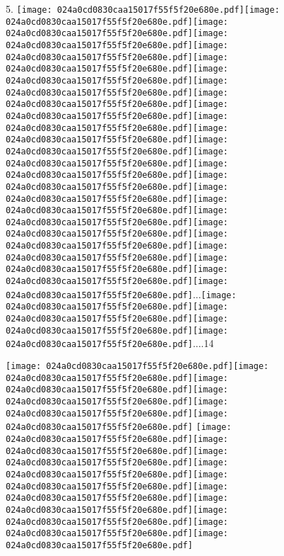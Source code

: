 \documentclass{article}
\newcommand{\origpg}[2]{\texttt{[image: 024a0cd0830caa15017f55f5f20e680e.pdf]}}
\begin{document}
{\vspace{0.626pt}\hspace{18.094pt}5. \origpg2{121.46pt 428.44pt 129.55pt 444.58pt}\origpg2{129.63pt 428.44pt 136.8pt 444.58pt}\hspace{-0.178pt}\origpg2{136.62pt 428.44pt 144.46pt 444.58pt}\origpg2{144.56pt 428.44pt 152.61pt 444.58pt}\origpg2{152.52pt 428.44pt 164.57pt 444.58pt}\hspace{-0.742pt}\origpg2{163.83pt 428.44pt 171.95pt 444.58pt}\origpg2{172pt 428.44pt 179.17pt 444.58pt}\hspace{-0.178pt}\origpg2{178.99pt 428.44pt 187.62pt 444.58pt}\origpg2{187.62pt 428.44pt 196.26pt 444.58pt}\origpg2{69mm 428.44pt 203.49pt 444.58pt}\origpg2{203.39pt 428.44pt 219.53pt 444.58pt}\origpg2{219.53pt 428.44pt 235.67pt 444.58pt}\origpg2{235.67pt 428.44pt 251.81pt 444.58pt}\origpg2{251.81pt 428.44pt 267.95pt 444.58pt}\hspace{-0.242pt}\origpg2{267.71pt 428.44pt 283.85pt 444.58pt}\origpg2{283.85pt 428.44pt 299.99pt 444.58pt}\origpg2{299.99pt 428.44pt 316.13pt 444.58pt}\hspace{-0.242pt}\origpg2{315.89pt 428.44pt 332.03pt 444.58pt}\origpg2{332.03pt 428.44pt 348.17pt 444.58pt}\hspace{-0.242pt}\origpg2{347.93pt 428.44pt 364.07pt 444.58pt}\hspace{-0.242pt}\origpg2{363.82pt 428.44pt 379.96pt 444.58pt}\origpg2{379.96pt 428.44pt 396.11pt 444.58pt}\origpg2{396.11pt 428.44pt 412.25pt 444.58pt}\origpg2{412.25pt 428.44pt 428.39pt 444.58pt}\hspace{-0.242pt}\origpg2{428.14pt 428.44pt 444.28pt 444.58pt}...\origpg2{456.31pt 428.44pt 472.45pt 444.58pt}\origpg2{472.45pt 428.44pt 488.59pt 444.58pt}\hspace{-0.242pt}\origpg2{488.35pt 428.44pt 504.49pt 444.58pt}\origpg2{504.49pt 428.44pt 520.63pt 444.58pt}....14 

\vspace{19.995pt}\hspace{36.161pt} 

\vspace{27.964pt}\origpg2{85.303pt 380.48pt 96.068pt 396.62pt}\origpg2{96.133pt 380.48pt 104.77pt 396.62pt}\origpg2{104.77pt 380.48pt 113.4pt 396.62pt}\hspace{-0.161pt}\origpg2{113.24pt 380.48pt 120.41pt 396.62pt}\origpg2{120.46pt 380.48pt 128.53pt 396.62pt}\hspace{-0.113pt}\origpg2{128.41pt 380.48pt 136.26pt 396.62pt} \origpg2{140.44pt 380.48pt 148.49pt 396.62pt}\origpg2{148.4pt 380.48pt 157.03pt 396.62pt}\origpg2{157.03pt 380.48pt 164.08pt 396.62pt}\origpg2{164.08pt 380.48pt 171.25pt 396.62pt}\hspace{-0.21pt}\origpg2{171.04pt 380.48pt 179.11pt 396.62pt}\origpg2{179.21pt 380.48pt 186.37pt 396.62pt}\hspace{-0.42pt}\origpg2{185.95pt 380.48pt 193.01pt 396.62pt}\hspace{-0.307pt}\origpg2{192.7pt 380.48pt 200.77pt 396.62pt}\hspace{-0.355pt}\origpg2{200.42pt 380.48pt 208.49pt 396.62pt}\origpg2{208.58pt 380.48pt 219.43pt 396.62pt} 

}
\end{document}
